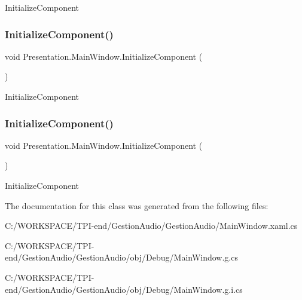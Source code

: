 Initialize\+Component 

\mbox{\label{class_presentation_1_1_main_window_ae65bc3f86809be61714a19b6c8b9fba0}} 
\subsubsection{\texorpdfstring{Initialize\+Component()}{InitializeComponent()}\hspace{0.1cm}{\footnotesize\ttfamily [3/4]}}
{\footnotesize\ttfamily void Presentation.\+Main\+Window.\+Initialize\+Component (\begin{DoxyParamCaption}{ }\end{DoxyParamCaption})}



Initialize\+Component 

\mbox{\label{class_presentation_1_1_main_window_ae65bc3f86809be61714a19b6c8b9fba0}} 
\subsubsection{\texorpdfstring{Initialize\+Component()}{InitializeComponent()}\hspace{0.1cm}{\footnotesize\ttfamily [4/4]}}
{\footnotesize\ttfamily void Presentation.\+Main\+Window.\+Initialize\+Component (\begin{DoxyParamCaption}{ }\end{DoxyParamCaption})}



Initialize\+Component 



The documentation for this class was generated from the following files\+:\begin{DoxyCompactItemize}
\item 
C\+:/\+W\+O\+R\+K\+S\+P\+A\+C\+E/\+T\+P\+I-\/end/\+Gestion\+Audio/\+Gestion\+Audio/Main\+Window.\+xaml.\+cs\item 
C\+:/\+W\+O\+R\+K\+S\+P\+A\+C\+E/\+T\+P\+I-\/end/\+Gestion\+Audio/\+Gestion\+Audio/obj/\+Debug/Main\+Window.\+g.\+cs\item 
C\+:/\+W\+O\+R\+K\+S\+P\+A\+C\+E/\+T\+P\+I-\/end/\+Gestion\+Audio/\+Gestion\+Audio/obj/\+Debug/Main\+Window.\+g.\+i.\+cs\end{DoxyCompactItemize}
